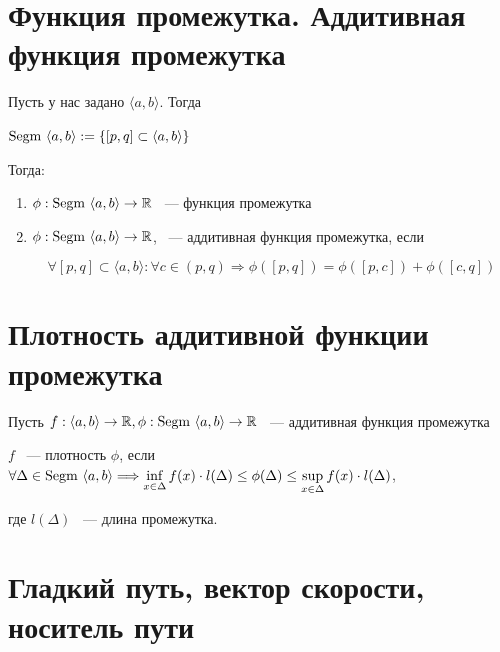 \documentclass{article}
\begin{document}
	\newpage
	
	\section{Функция промежутка. Аддитивная функция промежутка}
	
        Пусть у нас задано $\langle a, b \rangle$. Тогда
        
        $\Segm \langle a, b \rangle := \left\{ [p, q] \subset \langle a, b \rangle \right\}$
        
        Тогда:
        
        \begin{enumerate}
        
            \item $\phi : \Segm \langle a, b \rangle \rightarrow \mathbb{R}$ ~--- функция промежутка
            
            \item $\phi : \Segm \langle a, b \rangle \rightarrow \mathbb{R}$, ~--- аддитивная функция промежутка, если
            
                $$\forall [p, q] \subset \langle a, b \rangle : \forall c \in (p, q) \Longrightarrow \phi([p, q]) = \phi([p, c]) + \phi([c, q])$$
                
        \end{enumerate}
        
    \newpage
    
    \section{Плотность аддитивной функции промежутка}
    
        Пусть $f : \langle a, b \rangle \rightarrow \mathbb{R}, \phi: \Segm \langle a, b \rangle \rightarrow \mathbb{R}$ ~--- аддитивная функция промежутка
        
            $f$ ~--- плотность $\phi$, если $\forall \Delta \in \Segm \langle a, b \rangle \Longrightarrow \inf\limits_{x \in \Delta} f(x) \cdot l(\Delta) \leq \phi(\Delta) \leq \sup\limits_{x \in \Delta} f(x) \cdot l(\Delta)$, 
            
            где $l(\Delta)$ ~--- длина промежутка.
		
    \newpage
    
    \section{Гладкий путь, вектор скорости, носитель пути}
    
\end{document}
